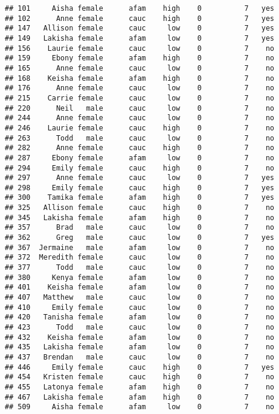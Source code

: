 \documentclass[
]{article}
\begin{document}
\begin{verbatim}
## 101     Aisha female      afam    high    0          7   yes
## 102      Anne female      cauc    high    0          7   yes
## 147   Allison female      cauc     low    0          7   yes
## 149   Lakisha female      afam     low    0          7   yes
## 156    Laurie female      cauc     low    0          7    no
## 159     Ebony female      afam    high    0          7    no
## 165      Anne female      cauc     low    0          7    no
## 168    Keisha female      afam    high    0          7    no
## 176      Anne female      cauc     low    0          7    no
## 215    Carrie female      cauc     low    0          7    no
## 220      Neil   male      cauc     low    0          7    no
## 244      Anne female      cauc     low    0          7    no
## 246    Laurie female      cauc    high    0          7    no
## 263      Todd   male      cauc     low    0          7    no
## 282      Anne female      cauc    high    0          7    no
## 287     Ebony female      afam     low    0          7    no
## 294     Emily female      cauc    high    0          7    no
## 297      Anne female      cauc     low    0          7   yes
## 298     Emily female      cauc    high    0          7   yes
## 300    Tamika female      afam    high    0          7   yes
## 325   Allison female      cauc    high    0          7    no
## 345   Lakisha female      afam    high    0          7    no
## 357      Brad   male      cauc     low    0          7    no
## 362      Greg   male      cauc     low    0          7   yes
## 367  Jermaine   male      afam     low    0          7    no
## 372  Meredith female      cauc     low    0          7    no
## 377      Todd   male      cauc     low    0          7    no
## 380     Kenya female      afam     low    0          7    no
## 401    Keisha female      afam     low    0          7    no
## 407   Matthew   male      cauc     low    0          7    no
## 410     Emily female      cauc     low    0          7    no
## 420   Tanisha female      afam     low    0          7    no
## 423      Todd   male      cauc     low    0          7    no
## 432    Keisha female      afam     low    0          7    no
## 435   Lakisha female      afam     low    0          7    no
## 437   Brendan   male      cauc     low    0          7    no
## 446     Emily female      cauc    high    0          7   yes
## 454   Kristen female      cauc    high    0          7    no
## 455   Latonya female      afam    high    0          7    no
## 467   Lakisha female      afam    high    0          7    no
## 509     Aisha female      afam     low    0          7    no

\end{verbatim}
\end{document}
